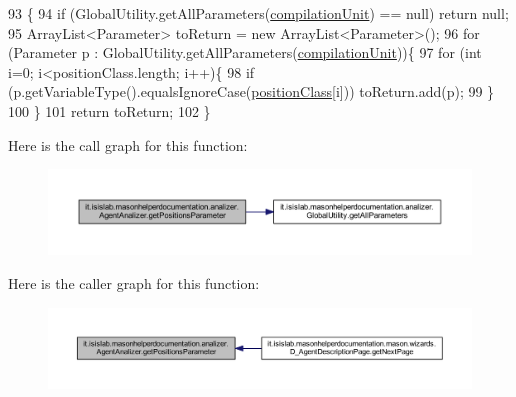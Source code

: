 \begin{DoxyCode}
93                                                        \{
94         \textcolor{keywordflow}{if} (GlobalUtility.getAllParameters(\hyperlink{classit_1_1isislab_1_1masonhelperdocumentation_1_1analizer_1_1_agent_analizer_a1fdd2196fdd7b7907ab94da91b8306f4}{compilationUnit}) == null) \textcolor{keywordflow}{return} null;
95         ArrayList<Parameter> toReturn = \textcolor{keyword}{new} ArrayList<Parameter>();
96         \textcolor{keywordflow}{for} (Parameter p : GlobalUtility.getAllParameters(\hyperlink{classit_1_1isislab_1_1masonhelperdocumentation_1_1analizer_1_1_agent_analizer_a1fdd2196fdd7b7907ab94da91b8306f4}{compilationUnit}))\{
97                 \textcolor{keywordflow}{for} (\textcolor{keywordtype}{int} i=0; i<positionClass.length; i++)\{
98                     \textcolor{keywordflow}{if} (p.getVariableType().equalsIgnoreCase(\hyperlink{classit_1_1isislab_1_1masonhelperdocumentation_1_1analizer_1_1_agent_analizer_a9d8e56c5d7ee2102e06e509b301205bb}{positionClass}[i]))    
      toReturn.add(p);
99                 \}               
100         \}
101         \textcolor{keywordflow}{return} toReturn;
102     \}   
\end{DoxyCode}


Here is the call graph for this function\-:\nopagebreak
\begin{figure}[H]
\begin{center}
\leavevmode
\includegraphics[width=350pt]{classit_1_1isislab_1_1masonhelperdocumentation_1_1analizer_1_1_agent_analizer_aa2e85956f4a23176c398294cf02d859d_cgraph}
\end{center}
\end{figure}




Here is the caller graph for this function\-:\nopagebreak
\begin{figure}[H]
\begin{center}
\leavevmode
\includegraphics[width=350pt]{classit_1_1isislab_1_1masonhelperdocumentation_1_1analizer_1_1_agent_analizer_aa2e85956f4a23176c398294cf02d859d_icgraph}
\end{center}
\end{figure}


